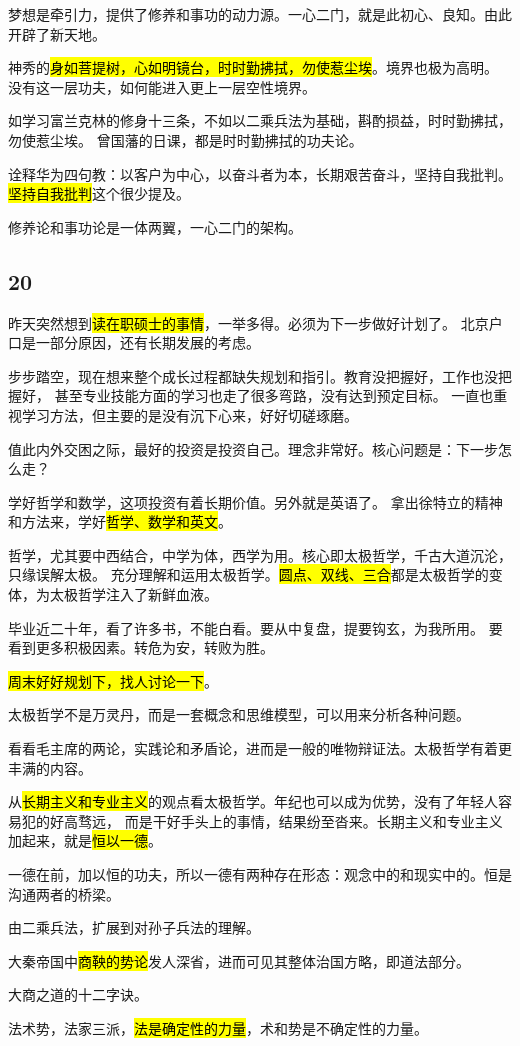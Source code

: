 梦想是牵引力，提供了修养和事功的动力源。一心二门，就是此初心、良知。由此开辟了新天地。

神秀的\hl{身如菩提树，心如明镜台，时时勤拂拭，勿使惹尘埃}。境界也极为高明。
没有这一层功夫，如何能进入更上一层空性境界。

如学习富兰克林的修身十三条，不如以二乘兵法为基础，斟酌损益，时时勤拂拭，勿使惹尘埃。
曾国藩的日课，都是时时勤拂拭的功夫论。

诠释华为四句教：以客户为中心，以奋斗者为本，长期艰苦奋斗，坚持自我批判。
\hl{坚持自我批判}这个很少提及。

\hrulefill

修养论和事功论是一体两翼，一心二门的架构。

\subsection{20}

昨天突然想到\hl{读在职硕士的事情}，一举多得。必须为下一步做好计划了。
北京户口是一部分原因，还有长期发展的考虑。

步步踏空，现在想来整个成长过程都缺失规划和指引。教育没把握好，工作也没把握好，
甚至专业技能方面的学习也走了很多弯路，没有达到预定目标。
一直也重视学习方法，但主要的是没有沉下心来，好好切磋琢磨。

值此内外交困之际，最好的投资是投资自己。理念非常好。核心问题是：下一步怎么走？

学好哲学和数学，这项投资有着长期价值。另外就是英语了。
拿出徐特立的精神和方法来，学好\hl{哲学、数学和英文}。

哲学，尤其要中西结合，中学为体，西学为用。核心即太极哲学，千古大道沉沦，只缘误解太极。
充分理解和运用太极哲学。\hl{圆点、双线、三合}都是太极哲学的变体，为太极哲学注入了新鲜血液。

毕业近二十年，看了许多书，不能白看。要从中复盘，提要钩玄，为我所用。
要看到更多积极因素。转危为安，转败为胜。

\hl{周末好好规划下，找人讨论一下}。

\hrulefill

太极哲学不是万灵丹，而是一套概念和思维模型，可以用来分析各种问题。

看看毛主席的两论，实践论和矛盾论，进而是一般的唯物辩证法。太极哲学有着更丰满的内容。

从\hl{长期主义和专业主义}的观点看太极哲学。年纪也可以成为优势，没有了年轻人容易犯的好高骛远，
而是干好手头上的事情，结果纷至沓来。长期主义和专业主义加起来，就是\hl{恒以一德}。

一德在前，加以恒的功夫，所以一德有两种存在形态：观念中的和现实中的。恒是沟通两者的桥梁。

\hrulefill

由二乘兵法，扩展到对孙子兵法的理解。

大秦帝国中\hl{商鞅的势论}发人深省，进而可见其整体治国方略，即道法部分。

大商之道的十二字诀。

法术势，法家三派，\hl{法是确定性的力量}，术和势是不确定性的力量。
